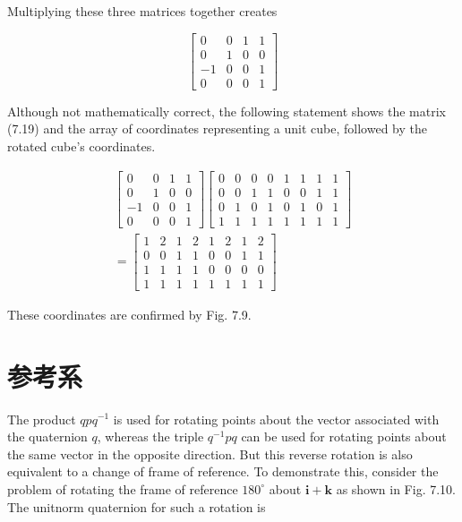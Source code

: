 Multiplying these three matrices together creates

$$
\left[\begin{array}{cccc}
0 & 0 & 1 & 1 \\
0 & 1 & 0 & 0 \\
-1 & 0 & 0 & 1 \\
0 & 0 & 0 & 1
\end{array}\right]
$$

Although not mathematically correct, the following statement shows the matrix (7.19) and the array of coordinates representing a unit cube, followed by the rotated cube's coordinates.

$$
\begin{gathered}
{\left[\begin{array}{cccc}
0 & 0 & 1 & 1 \\
0 & 1 & 0 & 0 \\
-1 & 0 & 0 & 1 \\
0 & 0 & 0 & 1
\end{array}\right]\left[\begin{array}{llllllll}
0 & 0 & 0 & 0 & 1 & 1 & 1 & 1 \\
0 & 0 & 1 & 1 & 0 & 0 & 1 & 1 \\
0 & 1 & 0 & 1 & 0 & 1 & 0 & 1 \\
1 & 1 & 1 & 1 & 1 & 1 & 1 & 1
\end{array}\right]} \\
=\left[\begin{array}{llllllll}
1 & 2 & 1 & 2 & 1 & 2 & 1 & 2 \\
0 & 0 & 1 & 1 & 0 & 0 & 1 & 1 \\
1 & 1 & 1 & 1 & 0 & 0 & 0 & 0 \\
1 & 1 & 1 & 1 & 1 & 1 & 1 & 1
\end{array}\right]
\end{gathered}
$$

These coordinates are confirmed by Fig. 7.9.

\section{参考系}
The product $q p q^{-1}$ is used for rotating points about the vector associated with the quaternion $q$, whereas the triple $q^{-1} p q$ can be used for rotating points about the same vector in the opposite direction. But this reverse rotation is also equivalent to a change of frame of reference. To demonstrate this, consider the problem of rotating the frame of reference $180^{\circ}$ about $\mathbf{i}+\mathbf{k}$ as shown in Fig. 7.10. The unitnorm quaternion for such a rotation is

